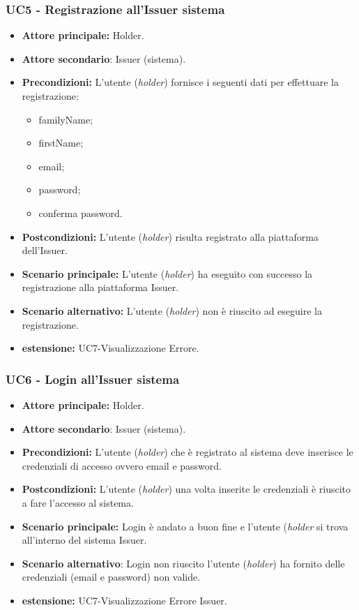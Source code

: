 \subsubsection{UC5 - Registrazione all'Issuer sistema}
\begin{itemize}
\item \textbf{Attore principale:} Holder.
\item \textbf{Attore secondario}: Issuer (sistema). 
\item \textbf{Precondizioni:} L’utente (\textit{holder}) fornisce i seguenti dati per effettuare la registrazione:
\begin{itemize}
    \item familyName;
    \item firstName;
    \item email;
    \item password;
    \item conferma password.
\end{itemize}
\item \textbf{Postcondizioni:} L’utente (\textit{holder}) risulta registrato alla piattaforma dell'Issuer.
\item \textbf{Scenario principale:} L'utente (\textit{holder}) ha eseguito con successo la registrazione alla piattaforma Issuer.
\item \textbf{Scenario alternativo:} L'utente (\textit{holder}) non è riuscito ad eseguire la registrazione.
\item \textbf{estensione:} UC7-Visualizzazione Errore.
\end{itemize}

\subsubsection{UC6 - Login all'Issuer sistema}
\begin{itemize}
\item \textbf{Attore principale:} Holder.
\item \textbf{Attore secondario}: Issuer (sistema). 
\item \textbf{Precondizioni:} L'utente (\textit{holder}) che è registrato al sistema deve inserisce le credenziali di accesso ovvero email e password.
\item \textbf{Postcondizioni:} L'utente (\textit{holder}) una volta inserite le credenziali è riuscito a fare l'accesso al sistema.
\item \textbf{Scenario principale:} Login è andato a buon fine e l'utente  (\textit{holder} si trova all'interno del sistema Issuer.
\item \textbf{Scenario alternativo}: Login non riuscito l'utente (\textit{holder}) ha fornito delle credenziali (email e password) non valide.
\item \textbf{estensione:} UC7-Visualizzazione Errore Issuer.
\end{itemize}


